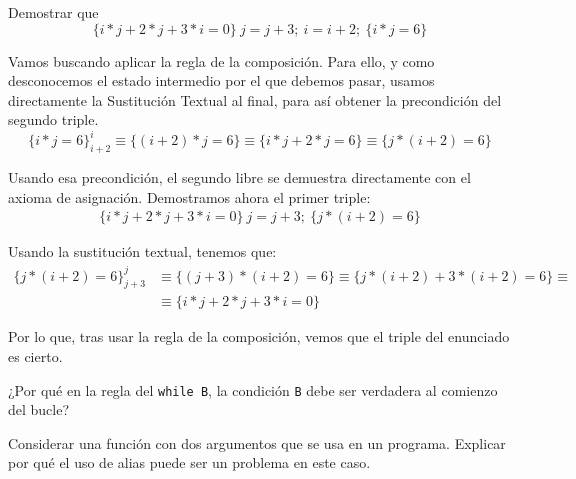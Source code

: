 \begin{ejercicio}
    Demostrar que
    \begin{equation*}
        \{i\ast j + 2 \ast j + 3\ast i = 0\}\ j=j+3;\ i=i+2;\ \{i\ast j=6\}
    \end{equation*}

    Vamos buscando aplicar la regla de la composición. Para ello, y como desconocemos el estado intermedio por el que debemos pasar, usamos directamente la Sustitución Textual al final, para así obtener la precondición del segundo triple.
    \begin{equation*}
        \{i\ast j=6\}_{i+2}^i \equiv \{(i+2)\ast j=6\} \equiv \{i\ast j+2\ast j=6\} \equiv \{j\ast(i+2)=6\}
    \end{equation*}

    Usando esa precondición, el segundo libre se demuestra directamente con el axioma de asignación. Demostramos ahora el primer triple:
    \begin{gather*}
        \{i\ast j + 2 \ast j + 3\ast i = 0\}\ j=j+3;\ \{j\ast(i+2)=6\}
    \end{gather*}

    Usando la sustitución textual, tenemos que:
    \begin{align*}
        \{j\ast(i+2)=6\}_{j+3}^j &\equiv \{(j+3)\ast(i+2)=6\} \equiv
        \{j\ast(i+2)+3\ast(i+2)=6\} \equiv \\ &\equiv \{i\ast j + 2 \ast j + 3\ast i = 0\}
    \end{align*}

    Por lo que, tras usar la regla de la composición, vemos que el triple del enunciado es cierto.
\end{ejercicio}

\begin{ejercicio}
    ¿Por qué en la regla del \verb|while B|, la condición \verb|B| debe ser verdadera al comienzo del bucle?

\end{ejercicio}

\begin{ejercicio}
    Considerar una función con dos argumentos que se usa en un programa. Explicar por qué el uso de alias puede ser un problema en este caso.

\end{ejercicio}

